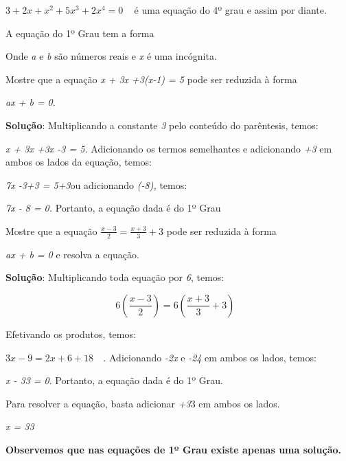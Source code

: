  \( 3+2x+x^{2}+5x^{3}+2x^{4}=0 \) ~ é uma equação do 4º grau e assim por diante.

\begin{tdefinicao}
A equação do 1º Grau tem a forma


Onde \textit{a} e \textit{b} são números reais e \textit{x} é uma incógnita.
\end{tdefinicao}

\begin{texemplo}
Mostre que a equação \textit{x + 3x +3(x-1) = 5} pode ser reduzida à forma

\textit{ax + b = 0}.

\textbf{Solução}: Multiplicando a constante \textit{3} pelo conteúdo do parêntesis, temos:

\textit{x + 3x +3x -3 = 5. }Adicionando os termos semelhantes e adicionando\textit{ +3} em ambos os lados da equação, temos:

\textit{7x -3+3 = 5+3}ou\textit{ }adicionando\textit{ (-8), }temos:

\textit{7x - 8 = 0. }Portanto, a equação dada é do 1º Grau\textit{~~ }\qedsymbol{}
\end{texemplo}

\begin{texemplo}
Mostre que a equação \( \frac{x-3}{2}=\frac{x+3}{3}+3 \) pode ser reduzida à forma

\textit{ax + b = 0} e resolva a equação.

\textbf{Solução}: Multiplicando toda equação por \textit{6}, temos:

 \[ 6 \left( \frac{x-3}{2} \right) =6 \left( \frac{x+3}{3}+3 \right) ~~~  \]

Efetivando os produtos, temos:

 \( 3x-9=2x+6+18~~~  \) \textit{.} Adicionando \textit{-2x} e \textit{-24} em ambos os lados, temos:

\textit{x - 33 = 0}. Portanto, a equação dada é do 1º Grau.

Para resolver a equação, basta adicionar \textit{+3}3 em ambos os lados.

\textit{x = 33} \qedsymbol{}
\end{texemplo}

\begin{caixa}
\textbf{Observemos que nas equações de 1º Grau existe apenas uma solução.}
\end{caixa}

